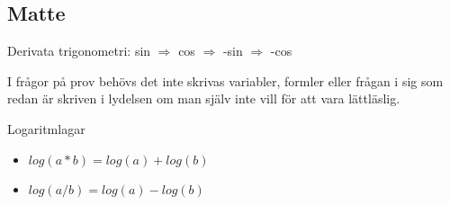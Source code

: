 \documentclass[a4paper]{article}
\begin{document}
\subsection{Matte}
Derivata trigonometri: sin $\Rightarrow$ cos $\Rightarrow$ -sin $\Rightarrow$ -cos 

I frågor på prov behövs det inte skrivas variabler, formler eller frågan i sig som redan är skriven i lydelsen om man själv inte vill för att vara lättläslig.

Logaritmlagar
\begin{itemize}
    \item $log(a*b)=log(a)+log(b)$ 
    \item $log(a/b)=log(a)-log(b)$
\end{itemize}
\end{document}
